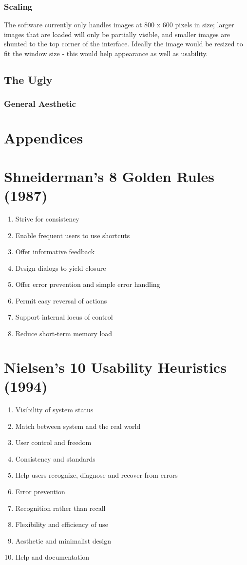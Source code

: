 \documentclass[a4paper,11pt,oneside]{article}
\begin{document}
\subsubsection{Scaling}
The software currently only handles images at 800 x 600 pixels in size;
larger images that are loaded will only be partially visible, and smaller
images are shunted to the top corner of the interface. Ideally the image would
be resized to fit the window size - this would help appearance as well as
usability.
\subsection{The Ugly}
\subsubsection{General Aesthetic}

\section{Appendices}
\appendix

\section{Shneiderman’s 8 Golden Rules (1987)}
\begin{enumerate}
\item Strive for consistency
\item Enable frequent users to use shortcuts
\item Offer informative feedback
\item Design dialogs to yield closure
\item Offer error prevention and simple error handling
\item Permit easy reversal of actions
\item Support internal locus of control
\item Reduce short-term memory load 
\end{enumerate}

\section{Nielsen’s 10 Usability Heuristics (1994)}
\begin{enumerate}
\item Visibility of system status
\item Match between system and the real world
\item User control and freedom
\item Consistency and standards
\item Help users recognize, diagnose and recover from errors
\item Error prevention
\item Recognition rather than recall
\item Flexibility and efficiency of use
\item Aesthetic and minimalist design
\item Help and documentation
\end{enumerate}
\end{document}
